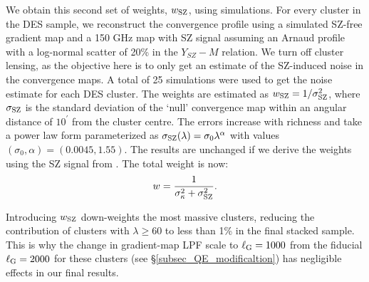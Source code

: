 We obtain this second set of weights, $w_{\rm SZ}$, using simulations. 
For every cluster in the DES sample, we reconstruct the convergence profile using a simulated SZ-free gradient map and a 150 GHz map with SZ signal assuming an Arnaud profile \citep{arnaud10} with a log-normal scatter of 20\% in the $Y_{SZ}-M$ relation. 
We turn off cluster lensing, as the objective here is to only get an estimate of the SZ-induced noise in the convergence maps.
A total of 25 simulations were used to get the noise estimate for each DES cluster.
The weights are estimated as
$w_{\rm SZ} = 1/\sigma_{\rm SZ}^{2}$, where $\sigma_{\rm SZ}$ is the standard deviation of the `null' convergence map within an angular distance of $10^{\prime}$ from the cluster centre.
The errors increase with richness and take a power law form parameterized as $\sigma_{\rm SZ}(\lambda) =  \sigma_{0}\lambda^{\alpha}$ with values $%
(\sigma_{0}, \alpha) = (0.0045, 1.55)$.
The results are unchanged if we derive the weights using the SZ signal from .
The total weight is now:
 \begin{equation}
 w = \frac{1}{\sigma_{\kappa}^{2} + \sigma_{\rm SZ}^{2}}.
\label{eq_cluster_weight}
 \end{equation}

Introducing $w_{\rm SZ}$ down-weights the most massive clusters, reducing the contribution
of clusters with $\lambda \ge 60$ to less than 1\% in the final stacked sample. 
This is why the change in gradient-map LPF scale to \mbox{$\ell_{\rm G} = 1000$} from the fiducial \mbox{$\ell_{\rm G} = 2000$}
for these clusters (see \S\ref{subsec_QE_modificaltion}) has negligible effects in our final results. 

